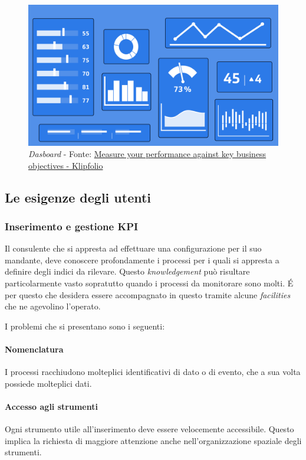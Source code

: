 \begin{figure}[H]
    \centering
    \includegraphics[width=0.80\columnwidth]{immagini/dashboard.png}
    \caption{\textit{Dasboard} - Fonte: \href{https://www.klipfolio.com/resources/articles/what-is-a-key-performance-indicator}{Measure your performance against key business objectives - Klipfolio}}
    \label{fig:dashboard}
\end{figure}
\subsection{Le esigenze degli utenti}
\subsubsection{Inserimento e gestione KPI}
Il consulente che si appresta ad effettuare una configurazione per il suo mandante, deve conoscere profondamente i processi per i quali si appresta a definire degli indici da rilevare. Questo \textit{knowledgement} può risultare particolarmente vasto sopratutto quando i processi da monitorare sono molti. \'E per questo che desidera essere accompagnato in questo tramite alcune \textit{facilities} che ne agevolino l'operato.

I problemi che si presentano sono i seguenti:
\paragraph{Nomenclatura} I processi racchiudono molteplici identificativi di dato o di evento, che a sua volta possiede molteplici dati.
\paragraph{Accesso agli strumenti} Ogni strumento utile all'inserimento deve essere velocemente accessibile. Questo implica la richiesta di maggiore attenzione anche nell'organizzazione spaziale degli strumenti.
